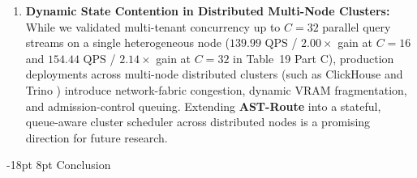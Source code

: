 \documentclass[10pt,a4paper]{article}
\makeatletter
\renewcommand\section{\@startsection{section}{1}{\z@}%
  {-18pt \@plus -4pt \@minus -2pt}%
  {8pt \@plus 2pt}%
  {\normalfont\large\bfseries}}
\makeatother
\begin{document}
\begin{enumerate}[leftmargin=1.5em,itemsep=2pt]
    \item \textbf{Dynamic State Contention in Distributed Multi-Node Clusters:} While we validated multi-tenant concurrency up to $C=32$ parallel query streams on a single heterogeneous node ($139.99\text{ QPS}$ / $2.00\times$ gain at $C=16$ and $154.44\text{ QPS}$ / $2.14\times$ gain at $C=32$ in Table~19 Part C), production deployments across multi-node distributed clusters (such as ClickHouse \cite{schulze2024clickhouse} and Trino \cite{sethi2019presto}) introduce network-fabric congestion, dynamic VRAM fragmentation, and admission-control queuing. Extending \textbf{AST-Route} into a stateful, queue-aware cluster scheduler across distributed nodes is a promising direction for future research.
\end{enumerate}

\section{Conclusion}
\end{document}
